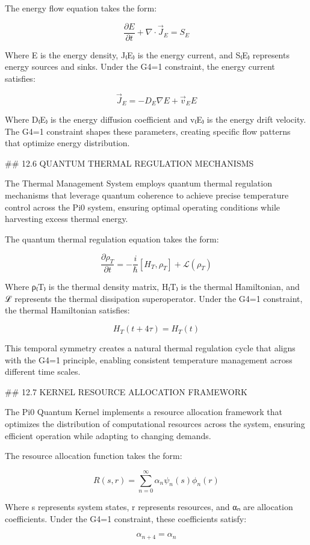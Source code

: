 The energy flow equation takes the form:

$$\frac{\partial E}{\partial t} + \nabla \cdot \vec{J}_E = S_E$$

Where E is the energy density, J₍E₎ is the energy current, and S₍E₎ represents energy sources and sinks. Under the G4=1 constraint, the energy current satisfies:

$$\vec{J}_E = -D_E \nabla E + \vec{v}_E E$$

Where D₍E₎ is the energy diffusion coefficient and v₍E₎ is the energy drift velocity. The G4=1 constraint shapes these parameters, creating specific flow patterns that optimize energy distribution.

## 12.6 QUANTUM THERMAL REGULATION MECHANISMS

The Thermal Management System employs quantum thermal regulation mechanisms that leverage quantum coherence to achieve precise temperature control across the Pi0 system, ensuring optimal operating conditions while harvesting excess thermal energy.

The quantum thermal regulation equation takes the form:

$$\frac{\partial \rho_T}{\partial t} = -\frac{i}{\hbar}[H_T, \rho_T] + \mathcal{L}(\rho_T)$$

Where ρ₍T₎ is the thermal density matrix, H₍T₎ is the thermal Hamiltonian, and ℒ represents the thermal dissipation superoperator. Under the G4=1 constraint, the thermal Hamiltonian satisfies:

$$H_T(t+4\tau) = H_T(t)$$

This temporal symmetry creates a natural thermal regulation cycle that aligns with the G4=1 principle, enabling consistent temperature management across different time scales.

## 12.7 KERNEL RESOURCE ALLOCATION FRAMEWORK

The Pi0 Quantum Kernel implements a resource allocation framework that optimizes the distribution of computational resources across the system, ensuring efficient operation while adapting to changing demands.

The resource allocation function takes the form:

$$R(s, r) = \sum_{n=0}^{\infty} \alpha_n \psi_n(s) \phi_n(r)$$

Where s represents system states, r represents resources, and αₙ are allocation coefficients. Under the G4=1 constraint, these coefficients satisfy:

$$\alpha_{n+4} = \alpha_n$$

